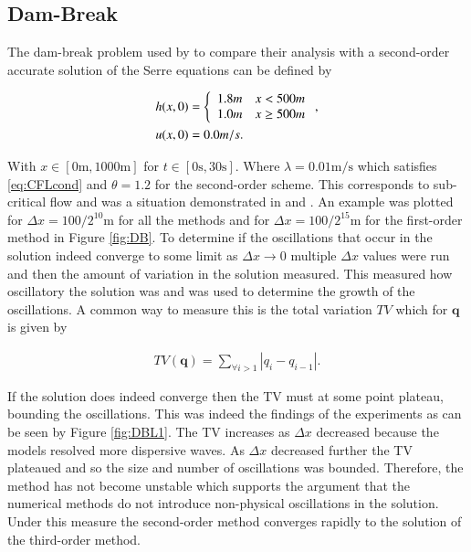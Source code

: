 \documentclass[SingleSpace,12pt,Proceedings]{Serre_ASCE}
\begin{document}
\subsection{Dam-Break}
The dam-break problem used by  to compare their analysis with a second-order accurate solution of the Serre equations can be defined by
\begin{linenomath*}
\begin{gather*}
\begin{split}
h(x,0) &= \left\lbrace \begin{array}{c c}
1.8m & x < 500m\\
1.0m & x \ge 500m\\
\end{array} \right. ,\\
u(x,0) &= 0.0m/s.
\end{split}
\end{gather*}
\end{linenomath*}
With $x \in \left[0\text{m},1000\text{m}\right]$ for $t \in \left[0\text{s},30\text{s}\right]$. Where $\lambda = 0.01 \text{m/s}$ which satisfies \eqref{eq:CFLcond} and $\theta = 1.2$ for the second-order scheme. This corresponds to sub-critical flow and was a situation demonstrated in  and . An example was plotted for $\Delta x = 100 /2^{10}\text{m}$ for all the methods and for $\Delta x = 100 /2^{15}\text{m}$ for the first-order method in Figure \ref{fig:DB}. To determine if the oscillations that occur in the solution indeed converge to some limit as $\Delta x \rightarrow 0$ multiple $\Delta x$ values were run and then the amount of variation in the solution measured. This measured how oscillatory the solution was and was used to determine the growth of the oscillations. A common way to measure this is the total variation $TV$ \cite{LeVeque-2002} which for $\boldsymbol{q}$ is given by
\begin{linenomath*}
\begin{gather*}
TV(\boldsymbol{q}) = \sum_{\forall i >1} |q_{i} - q_{i-1}|.
\end{gather*}
\end{linenomath*}
If the solution does indeed converge then the TV must at some point plateau, bounding the oscillations. This was indeed the findings of the experiments as can be seen by Figure \ref{fig:DBL1}. The TV increases as $\Delta x$ decreased because the models resolved more dispersive waves. As $\Delta x$ decreased further the TV plateaued and so the size and number of oscillations was bounded. Therefore, the method has not become unstable which supports the argument that the numerical methods do not introduce non-physical oscillations in the solution. Under this measure the second-order method converges rapidly to the solution of the third-order method.
\end{document}
